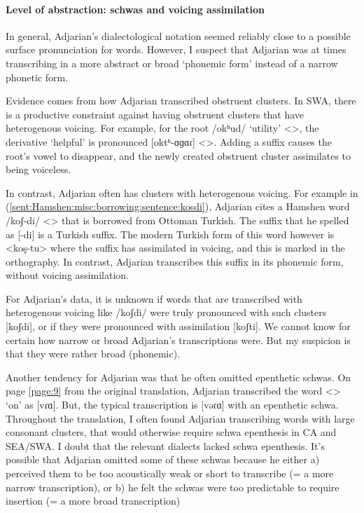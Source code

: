 \paragraph{Level of abstraction: schwas and   voicing assimilation}\label{sec:HossepIntro:phonotransc:adj:implicit:level of abstraction}

In general, Adjarian's dialectological notation seemed reliably close to a possible surface pronunciation for words. However, I suspect that Adjarian was at times transcribing in a more abstract or broad `phonemic form' instead of a narrow phonetic form. 

Evidence comes from    how Adjarian transcribed obstruent clusters. In SWA, there is a productive constraint against having obstruent clusters that have heterogenous voicing. For example, for the root /okʰud/ `utility' <>, the derivative `helpful' is pronounced [oktʰ-ɑɡɑɾ] <>. Adding a suffix causes the root's vowel to disappear, and the newly created obstruent cluster assimilates to being voiceless. 

In contrast, Adjarian often has clusters with heterogenous voicing. For example in (\ref{sent:Hamshen:misc:borrowing:sentence:kosdi}), Adjarian cites a Hamshen word /koʃ-di/ <> that is borrowed from Ottoman Turkish. The suffix that he spelled as [-di] is a Turkish suffix.  The modern Turkish form of this word however is <koş-tu> where the suffix has assimilated in voicing, and this is marked in the orthography. In contrast, Adjarian transcribes this suffix in its phonemic form, without voicing assimilation.

For Adjarian's data, it is unknown if words that are transcribed with heterogenous voicing like /koʃdi/ were truly pronounced with such clusters [koʃdi], or if they were pronounced with assimilation [koʃti]. We cannot know for certain how narrow or broad  Adjarian's transcriptions were. But my suspicion is that they were rather broad (phonemic). 

Another   tendency for Adjarian was that he often omitted epenthetic schwas. On page \ref{page:9} from the original translation, Adjarian transcribed the word <> `on' as [vɾɑ]. But, the typical transcription is [vəɾɑ] with an epenthetic schwa. Throughout the translation, I often found Adjarian transcribing words with large consonant clusters, that would otherwise require schwa epenthesis in CA and SEA/SWA. I doubt that the relevant dialects lacked schwa epenthesis. It's possible that  Adjarian omitted some of these schwas because he either a) perceived them to be too acoustically weak or short to transcribe (= a more narrow transcription), or b) he felt the schwas were too predictable to require insertion (= a more broad transcription) 



